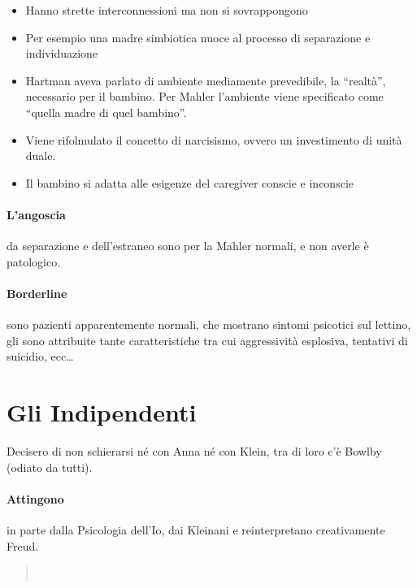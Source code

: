 \documentclass[12pt, a4paper]{article}
\begin{document}
\begin{itemize}
    \item Hanno strette interconnessioni ma non si sovrappongono
    \item Per esempio una madre simbiotica nuoce al processo di separazione e individuazione
    \item Hartman aveva parlato di ambiente mediamente prevedibile, la ``realt\`a'', necessario per il bambino. Per Mahler l'ambiente viene specificato come ``quella madre di quel bambino''.
    \item Viene rifolmulato il concetto di narcisismo, ovvero un investimento di unit\`a duale.
    \item Il bambino si adatta alle esigenze del caregiver conscie e inconscie
\end{itemize}

\paragraph{L'angoscia} da separazione e dell'estraneo sono per la Mahler normali, e non averle \`e patologico.

\paragraph{Borderline} sono pazienti apparentemente normali, che mostrano sintomi psicotici sul lettino, gli sono attribuite tante caratteristiche tra cui aggressivit\`a esplosiva, tentativi di suicidio, ecc\ldots

\section{Gli Indipendenti}

Decisero di non schierarsi n\'e con Anna n\'e con Klein, tra di loro c'\`e Bowlby (odiato da tutti).

\paragraph{Attingono} in parte dalla Psicologia dell'Io, dai Kleinani e reinterpretano creativamente Freud.

\begin{quote}
    \\
\end{quote}
\end{document}
